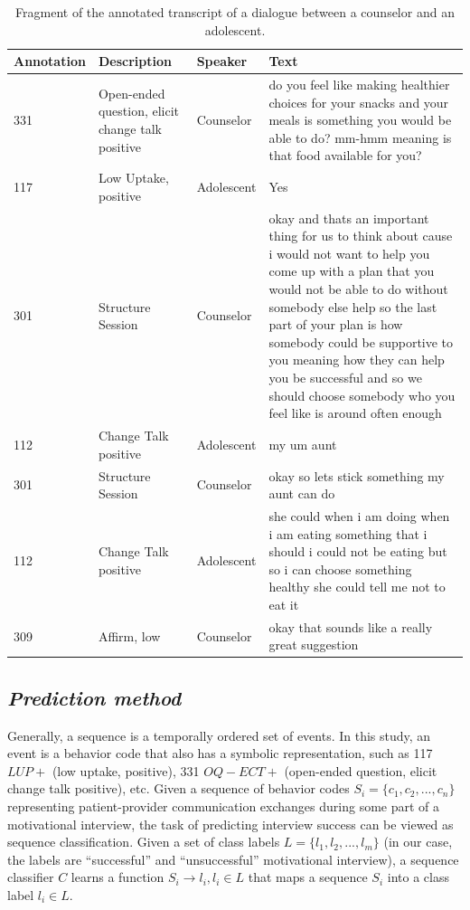 \documentclass{amia_summit_2018}
\begin{document}
\begin{table}[h]
\caption{Fragment of the annotated transcript of a dialogue between a counselor and an adolescent.}    
\label{tab:anno_examp}
\centering
\begin{tabular}{|l|p{3.6cm}|l|p{8cm}|}
\hline
Annotation  & Description & Speaker & Text \\\hline
331 &	Open-ended question, elicit change talk positive &	Counselor &	do you feel like making healthier choices for your snacks and your meals is something you would be able to do? mm-hmm meaning is that food available for you? \\\hline
117 &	Low Uptake, positive	& Adolescent &	Yes \\\hline
301 &	Structure Session	& Counselor &	okay and thats an important thing for us to think about cause i would not want to help you come up with a plan that you would not be able to do without somebody else help so the last part of your plan is how somebody could be supportive to you meaning how they can help you be successful and so we should choose somebody who you feel like is around often enough \\\hline
112 &	Change Talk positive	& Adolescent &	my um aunt \\\hline
301 &	Structure Session	& Counselor &	okay so lets stick something my aunt can do \\\hline
112 &	Change Talk positive &	Adolescent &	she could when i am doing when i am eating something that i should i could not be eating but so i can choose something healthy she could tell me not to eat it \\\hline
309 &	Affirm, low &	Counselor &	okay that sounds like a really great suggestion \\\hline
\end{tabular}
\end{table}  

\subsection*{\textit{Prediction method}}

Generally, a sequence is a temporally ordered set of events. In this study, an event is a behavior code that also has a symbolic representation, such as 117 $LUP+$ (low uptake, positive), 331 $OQ-ECT+$ (open-ended question, elicit change talk positive), etc.  Given a sequence of behavior codes $S_i = \{c_1, c_2,...,c_n\}$ representing patient-provider communication exchanges during some part of a motivational interview, the task of predicting interview success can be viewed as sequence classification. Given a set of class labels $L = \{l_1, l_2,...,l_m\}$ (in our case, the labels are ``successful'' and ``unsuccessful'' motivational interview), a sequence classifier $C$ learns a function $S_i \to l_i, l_i \in L$ that maps a sequence $S_i$ into a class label $l_i \in L$.
\end{document}
